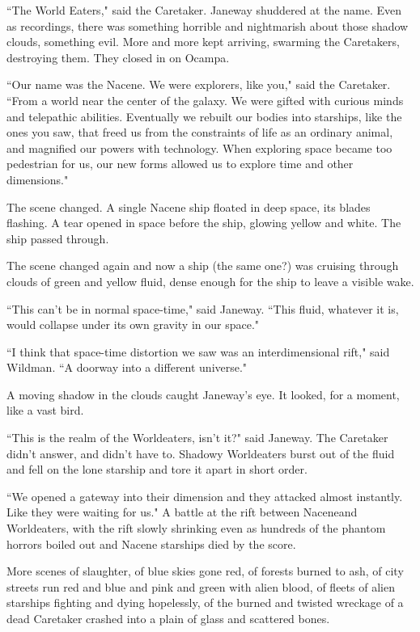 \documentclass[twoside,letterpaper,12pt]{memoir}
\begin{document}
``The World Eaters," said the Caretaker. Janeway shuddered at the name. Even as recordings, there was something horrible and nightmarish about those shadow clouds, something evil. More and more kept arriving, swarming the Caretakers, destroying them. They closed in on Ocampa. 

``Our name was the Nacene. We were explorers, like you," said the Caretaker. ``From a world near the center of the galaxy. We were gifted with curious minds and telepathic abilities. Eventually we rebuilt our bodies into starships, like the ones you saw, that freed us from the constraints of life as an ordinary animal, and magnified our powers with technology. When exploring space became too pedestrian for us, our new forms allowed us to explore time and other dimensions." 

The scene changed. A single Nacene ship floated in deep space, its blades flashing. A tear opened in space before the ship, glowing yellow and white. The ship passed through. 

The scene changed again and now a ship (the same one?) was cruising through clouds of green and yellow fluid, dense enough for the ship to leave a visible wake. 

``This can't be in normal space-time," said Janeway. ``This fluid, whatever it is, would collapse under its own gravity in our space." 

``I think that space-time distortion we saw was an interdimensional rift," said Wildman. ``A doorway into a different universe." 

A moving shadow in the clouds caught Janeway's eye. It looked, for a moment, like a vast bird. 

``This is the realm of the Worldeaters, isn't it?" said Janeway. The Caretaker didn't answer, and didn't have to. Shadowy Worldeaters burst out of the fluid and fell on the lone starship and tore it apart in short order. 

``We opened a gateway into their dimension and they attacked almost instantly. Like they were waiting for us." A battle at the rift between Naceneand Worldeaters, with the rift slowly shrinking even as hundreds of the phantom horrors boiled out and Nacene starships died by the score. 

More scenes of slaughter, of blue skies gone red, of forests burned to ash, of city streets run red and blue and pink and green with alien blood, of fleets of alien starships fighting and dying hopelessly, of the burned and twisted wreckage of a dead Caretaker crashed into a plain of glass and scattered bones. 
\end{document}
